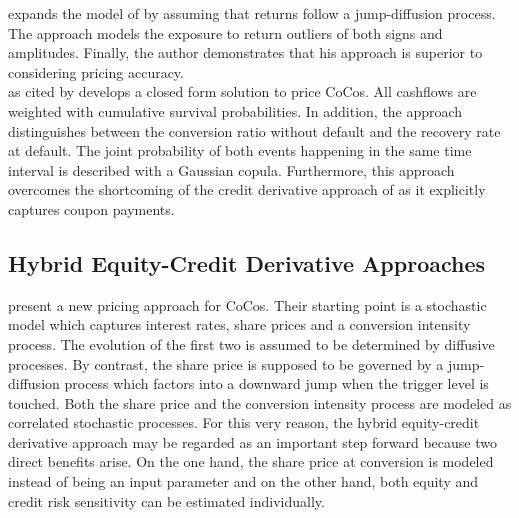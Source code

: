 \citet{erismann2015pricing} expands the model of \citet{de2011pricing} by assuming that returns follow a jump-diffusion process. The approach models the exposure to return outliers of both signs and amplitudes. Finally, the author demonstrates that his approach is superior to \citet{de2011pricing} considering pricing accuracy.\\

\citet{serjantov2011hybrid} as cited by \citet{wilkens2014contingent} develops a closed form solution to price CoCos. All cashflows are weighted with cumulative survival probabilities. In addition, the approach distinguishes between the conversion ratio without default and the recovery rate at default. The joint probability of both events happening in the same time interval is described with a Gaussian copula. Furthermore, this approach overcomes the shortcoming of the credit derivative approach of \citet{de2011pricing} as it explicitly captures coupon payments.

\subsection*{Hybrid Equity-Credit Derivative Approaches}
\citet{turfus2015cocos} present a new pricing approach for CoCos. Their starting point is a stochastic model which captures interest rates, share prices and a conversion intensity process. The evolution of the first two is assumed to be determined by diffusive processes. By contrast, the share price is supposed to be governed by a jump-diffusion process which factors into a downward jump when the trigger level is touched. Both the share price and the conversion intensity process are modeled as correlated stochastic processes. For this very reason, the hybrid equity-credit derivative approach may be regarded as an important step forward because two direct benefits arise. On the one hand, the share price at conversion is modeled instead of being an input parameter and on the other hand, both equity and credit risk sensitivity can be estimated individually.  

